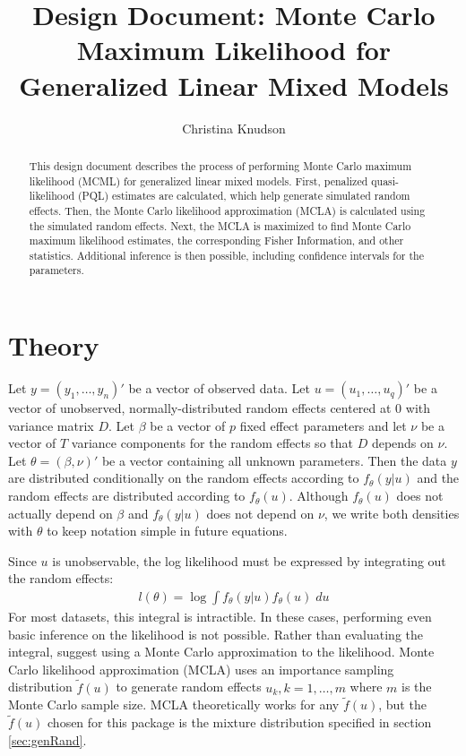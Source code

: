 \documentclass{article}
\title{Design Document: Monte Carlo Maximum Likelihood for Generalized Linear Mixed Models}
\author{Christina Knudson}
\begin{document}
\maketitle{}

\begin{abstract}
This design document describes the process of performing Monte Carlo maximum likelihood (MCML) for generalized linear mixed models.  First, penalized quasi-likelihood (PQL) estimates are calculated, which help generate simulated random effects. Then, the Monte Carlo likelihood approximation (MCLA)  is calculated using the simulated random effects. Next, the MCLA is maximized to find Monte Carlo maximum likelihood estimates, the corresponding Fisher Information, and other statistics. Additional inference is then possible, including confidence intervals for the parameters.
\end{abstract}

\section{Theory}

Let $y=(y_1, \ldots, y_n)'$ be a vector of observed data. Let $u=(u_1,\ldots,u_q)'$ be a vector of unobserved, normally-distributed random effects centered at 0 with variance matrix $D$. Let $\beta$ be a vector of $p$ fixed effect parameters and let $\nu$ be a vector of $T$ variance components for the random effects so that $D$ depends on $\nu$. Let $\theta=(\beta ,  \nu)'$ be a vector containing all unknown parameters. Then the data $y$ are distributed conditionally on the random effects according to $f_\theta(y|u)$ and the random effects are distributed according to $f_\theta(u)$. Although $f_\theta(u)$ does not actually depend on $\beta$ and $f_\theta(y|u)$ does not depend on $\nu$, we write both densities with $\theta$ to keep notation simple in future equations.

Since $u$ is unobservable, the log likelihood must be expressed by integrating out the random effects:
\begin{align}
l(\theta)=\log \int f_\theta(y|u) f_\theta(u) \; du
\end{align}
For most datasets, this integral is intractible. In these cases, performing even basic inference on the likelihood is not possible. Rather than evaluating the integral, \citet{geyer:thom:1992} suggest using a Monte Carlo approximation to the likelihood. Monte Carlo likelihood approximation (MCLA) uses an importance sampling distribution $\tilde{f}(u)$ to generate random effects $u_k, k=1, \ldots, m$ where $m$ is the Monte Carlo sample size.  MCLA theoretically works for any $\tilde{f}(u)$, but the  $\tilde{f}(u)$ chosen for this package is the mixture distribution specified in section \ref{sec:genRand}.
\end{document}
